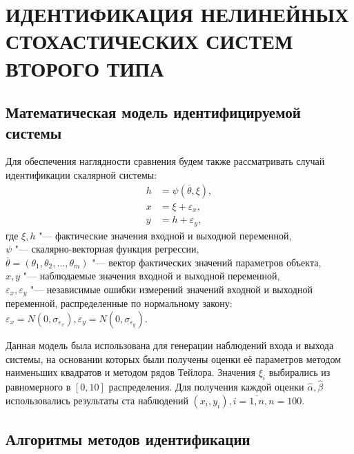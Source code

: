 \chapter[Идентификация нелинейных стохастических систем второго типа]{%
  ИДЕНТИФИКАЦИЯ НЕЛИНЕЙНЫХ СТОХАСТИЧЕСКИХ
  СИСТЕМ ВТОРОГО ТИПА
}

\section{Математическая модель идентифицируемой системы}

Для обеспечения наглядности сравнения будем также рассматривать случай
идентификации скалярной системы:
\begin{equation}
  \label{eq:nonlinear_model_scalar}
  \begin{aligned}
  h &= \psi(\overline{\theta}, \xi), \\
  x &= \xi + \varepsilon_x, \\
  y &= h + \varepsilon_y,
  \end{aligned}
\end{equation}
где \( \xi, h \) "--- фактические значения входной и выходной переменной, \\
\hspace*{7mm} \( \psi \) "--- скалярно-векторная функция регрессии, \\
\hspace*{7mm} \( \overline{\theta} = (\theta_1, \theta_2, \dotsc, \theta_m) \)
"--- вектор фактических значений параметров объекта, \\
\hspace*{7mm} \( x, y \) "--- наблюдаемые значения входной и выходной переменной, \\
\hspace*{6mm} \( \varepsilon_x, \varepsilon_y \)
"--- независимые ошибки измерений значений входной и выходной переменной,
распределенные по нормальному закону:
\(
\varepsilon_x = N(0, \sigma_{\varepsilon_x}),
\varepsilon_y = N(0, \sigma_{\varepsilon_y})
\).

Данная модель была использована для генерации наблюдений входа и выхода системы,
на основании которых были получены оценки её параметров
методом наименьших квадратов и методом рядов Тейлора.
Значения \( \xi_i \) выбирались из равномерного в \( [0, 10] \) распределения.
Для получения каждой оценки \( \hat{\alpha}, \hat{\beta} \) использовались результаты
ста наблюдений \( ( x_i, y_i ), i = \overline{1, n}, n = 100 \).

\section{Алгоритмы методов идентификации}

